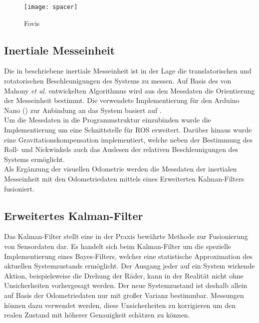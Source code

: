 \begin{figure}[!ht]
	\begin{center}
		\texttt{[image: spacer]}
		\caption{Fovis }
		\label{fig.fovis}
	\end{center}
\end{figure}

\subsection{Inertiale Messeinheit}
Die in  beschriebene inertiale Messeinheit ist in der Lage die translatorischen und rotatorischen Beschleunigungen des Systems zu messen. Auf Basis des von Mahony \textit{et al.} \cite{Mahony2008} entwickelten Algorithmus wird aus den Messdaten die Orientierung der Messeinheit bestimmt. Die verwendete Implementierung für den Arduino Nano () zur Anbindung an das System basiert auf \cite{IMUCode}.\\
Um die Messdaten in die Programmstruktur einzubinden wurde die Implementierung um eine Schnittstelle für ROS erweitert. Darüber hinaus wurde eine Gravitationskompensation implementiert, welche neben der Bestimmung des Roll- und Nickwinkels auch das Auslesen der relativen Beschleunigungen des Systems ermöglicht.\\
Als Ergänzung der visuellen Odometrie werden die Messdaten der inertialen Messeinheit mit den Odometriedaten mittels eines Erweiterten Kalman-Filters fusioniert.

\subsection{Erweitertes Kalman-Filter}
Das Kalman-Filter stellt eine in der Praxis bewährte Methode zur Fusionierung von Sensordaten dar. Es handelt sich beim Kalman-Filter \cite{Kalman1960} um die spezielle Implementierung eines Bayes-Filters, welcher eine statistische Approximation des aktuellen Systemzustands ermöglicht. Der Ausgang jeder auf ein System wirkende Aktion, beispielsweise die Drehung der Räder, kann in der Realität nicht ohne Unsicherheiten vorhergesagt werden. Der neue Systemzustand ist deshalb allein auf Basis der Odometriedaten nur mit großer Varianz bestimmbar. Messungen können dazu verwendet werden, diese Unsicherheiten zu korrigieren um den realen Zustand mit höherer Genauigkeit schätzen zu können.\\

